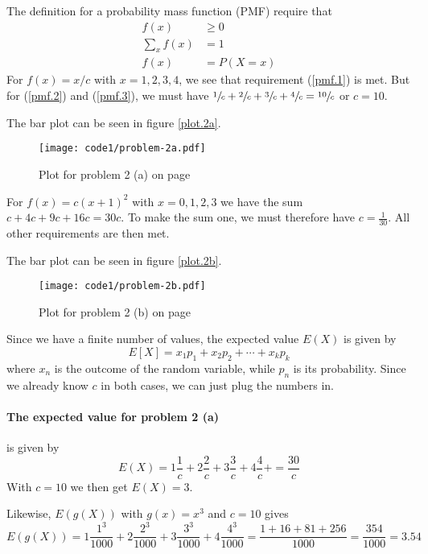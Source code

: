 \documentclass[a4paper,english,12pt]{article}
\begin{document}
The definition for a probability mass function (PMF) require that
\begin{align}
  f(x) &\geqslant 0 \label{pmf.1} \\
  \sum_x{f(x)} &= 1 \label{pmf.2} \\
  f(x) &= P(X=x) \label{pmf.3}
\end{align}
For $f(x) = x/c$ with $x=1,2,3,4$, we see that requirement (\ref{pmf.1}) is met.
But for (\ref{pmf.2}) and (\ref{pmf.3}), we must have
$\sfrac{1}{c} + \sfrac{2}{c} + \sfrac{3}{c} + \sfrac{4}{c} = \sfrac{10}{c}$
or $c=10$.

The bar plot can be seen in figure \vref{plot.2a}.

\begin{figure}[h]
  \texttt{[image: code1/problem-2a.pdf]}
  \caption{Plot for problem 2 (a) on page \pageref{problem.2 (a)}}
  \label{plot.2a}
\end{figure}

For $f(x) = c(x+1)^2$ with $x=0,1,2,3$ we have the sum $c+4c+9c+16c=30c$.  To
make the sum one, we must therefore have $c=\frac{1}{30}$. All other
requirements are then met.

The bar plot can be seen in figure \vref{plot.2b}.

\begin{figure}[h]
  \texttt{[image: code1/problem-2b.pdf]}
  \caption{Plot for problem 2 (b) on page \pageref{problem.2 (b)}}
  \label{plot.2b}
\end{figure}

Since we have a finite number of values, the expected value $E(X)$ is given by
\[
  E[X] = x_1p_1 + x_2p_2 + \cdots + x_kp_k
\]
where $x_n$ is the outcome of the random variable, while $p_n$ is its
probability. Since we already know $c$ in both cases, we can just plug the
numbers in.

\paragraph{The expected value for problem 2 (a)} is given by
\[
  E(X) =
      1\frac{1}{c} +
      2\frac{2}{c} +
      3\frac{3}{c} +
      4\frac{4}{c} +
      = \frac{30}{c}
\]
With $c=10$ we then get $E(X) = 3$.

Likewise, $E(g(X))$ with $g(x)=x^3$ and $c=10$ gives
\[
  E(g(X)) =
    1 \frac{1^3}{1000} +
    2 \frac{2^3}{1000} +
    3 \frac{3^3}{1000} +
    4 \frac{4^3}{1000} =
    \frac{1 + 16 + 81 + 256}{1000} = \frac{354}{1000} = 3.54
\]
\end{document}
